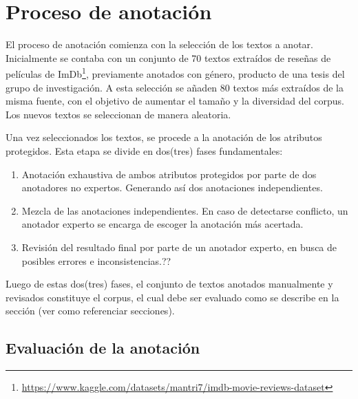 \section{Proceso de anotaci\'on}
El proceso de anotaci\'on comienza con la selecci\'on de los textos a anotar. Inicialmente se contaba con un conjunto de 70 textos 
extra\'idos de rese\~nas de pel\'iculas de ImDb\footnote{\url{https://www.kaggle.com/datasets/mantri7/imdb-movie-reviews-dataset}}, 
previamente anotados con g\'enero, producto de una tesis del grupo de investigaci\'on. A esta selecci\'on se a\~naden 80 textos m\'as 
extra\'idos de la misma fuente, con el objetivo de aumentar el tama\~no y la diversidad del corpus. Los nuevos textos se seleccionan 
de manera aleatoria.

Una vez seleccionados los textos, se procede a la anotaci\'on de los atributos protegidos. Esta etapa se divide en dos(tres) fases 
fundamentales:
\begin{enumerate}
    \item Anotaci\'on exhaustiva de ambos atributos protegidos por parte de dos anotadores no expertos. Generando as\'i dos anotaciones 
    independientes.
    \item Mezcla de las anotaciones independientes. En caso de detectarse conflicto, un anotador experto se encarga de escoger la 
    anotaci\'on m\'as acertada.
    \item Revisi\'on del resultado final por parte de un anotador experto, en busca de posibles errores e inconsistencias.??
\end{enumerate}

Luego de estas dos(tres) fases, el conjunto de textos anotados manualmente y revisados constituye el corpus, el cual debe ser evaluado 
como se describe en la secci\'on (ver como referenciar secciones).
\subsection{Evaluaci\'on de la anotaci\'on}


